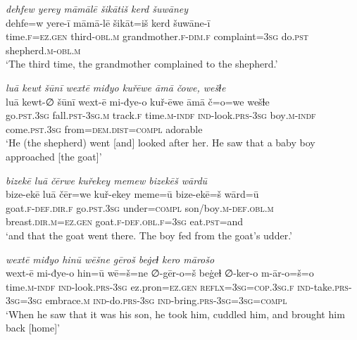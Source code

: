 \ea \label{KŠ.27}
\textit{dehfew yerey māmālē šikātiš kerd šuwāney} \\ 
\gll dehfe=w yere-ī māmā-lē šikāt=iš kerd šuwāne-ī \\ 
 time\textsc{.f}\textsc{=ez.gen} third\textsc{-obl}\textsc{.m} grandmother\textsc{.f}\textsc{-dim}\textsc{.f} complaint\textsc{=3sg} do\textsc{.pst} shepherd\textsc{.m}\textsc{-obl}\textsc{.m} \\ 
\glt `The third time, the grandmother complained to the shepherd.'
\z 
 
\ea \label{KŠ.30}
\textit{luā kewt šūnī wextē miđyo kuřēwe āmā čowe, wešɫe} \\ 
\gll luā kewt-∅ šūnī wext-ē mi-đye-o kuř-ēwe āmā č=o=we wešɫe \\ 
 go\textsc{.pst}\textsc{.3sg} fall\textsc{.pst}\textsc{-3sg}\textsc{.m} track\textsc{.f} time\textsc{.m}\textsc{-indf} \textsc{ind-}look\textsc{.prs}\textsc{-3sg} boy\textsc{.m}\textsc{-indf} come\textsc{.pst}\textsc{.3sg} from=\textsc{dem.dist}\textsc{=compl} adorable \\ 
\glt `He (the shepherd) went [and] looked after her. He saw that a baby boy approached [the goat]'
\z 
 
\ea \label{KŠ.31}
\textit{bizekē luā čērwe kuřekey memew bizekēš wārdū} \\ 
\gll bize-ekē luā čēr=we kuř-ekey meme=ū bize-ekē=š wārd=ū \\ 
 goat\textsc{.f}\textsc{-def}\textsc{.dir}\textsc{.f} go\textsc{.pst}\textsc{.3sg} under\textsc{=compl} son/boy\textsc{.m}\textsc{-def}\textsc{.obl}\textsc{.m} breast\textsc{.dir}\textsc{.m}\textsc{=ez.gen} goat\textsc{.f}\textsc{-def}\textsc{.obl}\textsc{.f}\textsc{=3sg} eat\textsc{.pst}=and \\ 
\glt `and that the goat went there. The boy fed from the goat’s udder.'
\z 
 
\ea \label{KŠ.32}
\textit{wextē miđyo hinū wēšne gēroš beġeɫ kero mārošo} \\ 
\gll wext-ē mi-đye-o hin=ū wē=š=ne ∅-gēr-o=š beġeɫ ∅-ker-o m-ār-o=š=o \\ 
 time\textsc{.m}\textsc{-indf} \textsc{ind-}look\textsc{.prs}\textsc{-3sg} ez.pron\textsc{=ez.gen} \textsc{reflx}\textsc{=3sg}\textsc{=cop}\textsc{.3sg}\textsc{.f} \textsc{ind-}take\textsc{.prs}\textsc{-3sg}\textsc{=3sg} embrace\textsc{.m} \textsc{ind-}do\textsc{.prs}\textsc{-3sg} \textsc{ind-}bring\textsc{.prs}\textsc{-3sg}\textsc{=3sg}\textsc{=compl} \\ 
\glt `When he saw that it was his son, he took him, cuddled him, and brought him back [home]'
\z 
 
